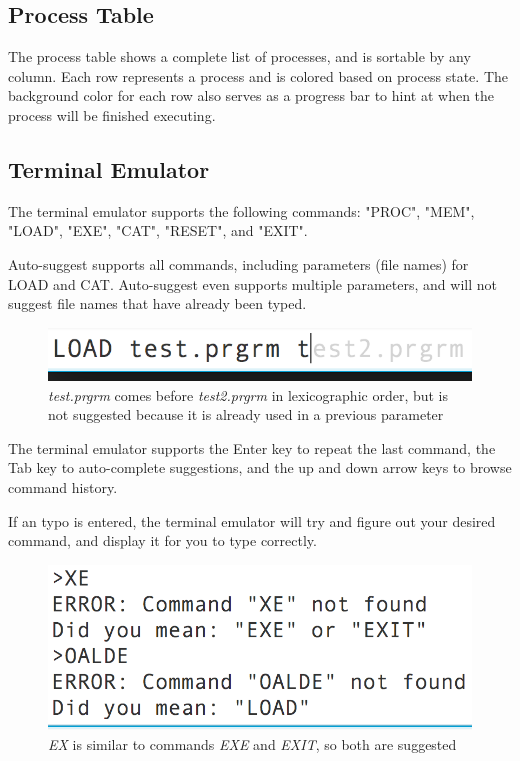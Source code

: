 \documentclass[paper=a4, fontsize=11pt]{scrartcl} %
\numberwithin{equation}{section} %
\numberwithin{figure}{section} %
\numberwithin{table}{section} %
\begin{document}
\subsection{Process Table}
The process table shows a complete list of processes, and is sortable by any column. Each row represents a process and is colored based on process state. The background color for each row also serves as a progress bar to hint at when the process will be finished executing.

\subsection{Terminal Emulator}
The terminal emulator supports the following commands: "PROC", "MEM", "LOAD", "EXE", "CAT", "RESET", and "EXIT".

Auto-suggest supports all commands, including parameters (file names) for LOAD and CAT. Auto-suggest even supports multiple parameters, and will not suggest file names that have already been typed.

\begin{figure}[H]
  \centering
    \includegraphics[scale=.5]{AutoSuggest.png}
  \caption{\textit{test.prgrm} comes before \textit{test2.prgrm} in lexicographic order, but is not suggested because it is already used in a previous parameter }
\end{figure}

The terminal emulator supports the Enter key to repeat the last command, the Tab key to auto-complete suggestions, and the up and down arrow keys to browse command history.

If an typo is entered, the terminal emulator will try and figure out your desired command, and display it for you to type correctly.

\begin{figure}[H]
  \centering
    \includegraphics[scale=.5]{Typo.png}
  \caption{ \textit{EX} is similar to commands \textit{EXE} and \textit{EXIT}, so both are suggested}
\end{figure}
\end{document}
